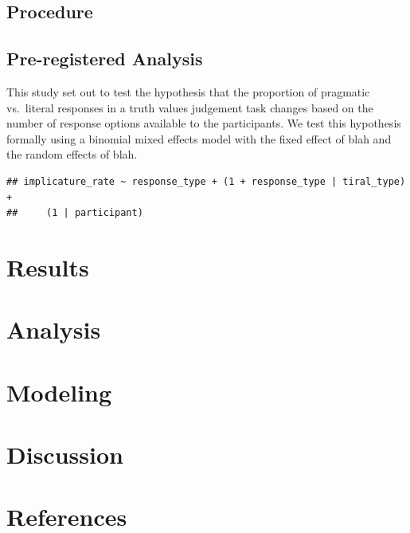 \documentclass[man]{apa6}
\theoremstyle{definition}
\theoremstyle{definition}
\theoremstyle{definition}
\theoremstyle{remark}
\begin{document}
\subsection{Procedure}\label{procedure}

\subsection{Pre-registered Analysis}\label{pre-registered-analysis}

This study set out to test the hypothesis that the proportion of
pragmatic vs.~literal responses in a truth values judgement task changes
based on the number of response options available to the participants.
We test this hypothesis formally using a binomial mixed effects model
with the fixed effect of blah and the random effects of blah.

\begin{verbatim}
## implicature_rate ~ response_type + (1 + response_type | tiral_type) + 
##     (1 | participant)
\end{verbatim}

\section{Results}\label{results}

\section{Analysis}\label{analysis}

\section{Modeling}\label{modeling}

\section{Discussion}\label{discussion}

\newpage

\section{References}\label{references}

\setlength{\parindent}{-0.5in} \setlength{\leftskip}{0.5in}
\end{document}
